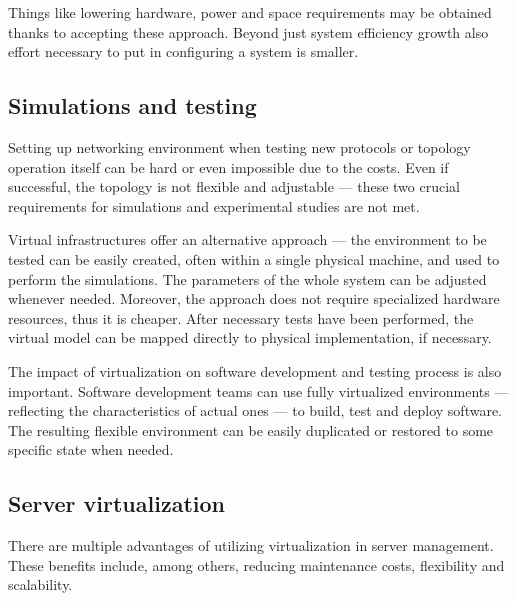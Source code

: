 \documentclass[11pt]{book}
\begin{document}
      Things like lowering hardware, power and space requirements may be obtained thanks to accepting these approach.
      Beyond just system efficiency growth also effort necessary to put in configuring a system is smaller. 


      \subsection{Simulations and testing}

        Setting up networking environment when testing new protocols or topology operation itself can be hard or even
        impossible due to the costs. Even if successful, the topology is not flexible and adjustable --- these two
        crucial requirements for simulations and experimental studies are not met.

        
        Virtual infrastructures offer an alternative approach --- the environment to be tested can be easily created,
        often within a single physical machine, and used to perform the simulations. The parameters of the whole system
        can be adjusted whenever needed. Moreover, the approach does not require specialized hardware resources, thus it
        is cheaper. After necessary tests have been performed, the virtual model can be mapped directly to physical
        implementation, if necessary.

        The impact of virtualization on software development and testing process is also important. Software development
        teams can use fully virtualized environments --- reflecting the characteristics of actual ones --- to build,
        test and deploy software. The resulting flexible environment can be easily duplicated or restored to some
        specific state when needed.




      \subsection{Server virtualization}
        
        There are multiple advantages of utilizing virtualization in server management. These benefits include, among
        others, reducing maintenance costs, flexibility and scalability.
\end{document}
